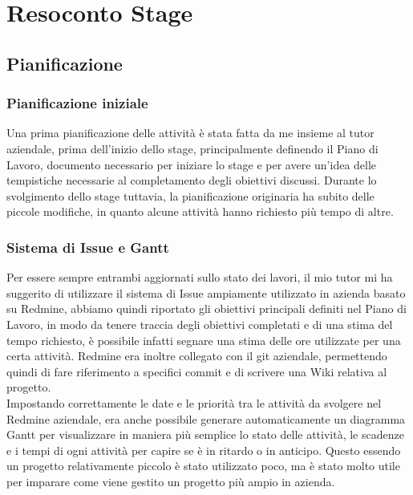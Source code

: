 
\chapter{Resoconto Stage}
\label{cap:resoconto-stage}

\section{Pianificazione}
\subsection{Pianificazione iniziale}\label{sec:pianificazione-iniziale}
Una prima pianificazione delle attività è stata fatta da me insieme al tutor aziendale, prima dell'inizio dello stage, principalmente definendo il Piano di Lavoro, documento necessario per iniziare lo stage e per avere un'idea delle tempistiche necessarie al completamento degli obiettivi discussi. Durante lo svolgimento dello stage tuttavia, la pianificazione originaria ha subito delle piccole modifiche, in quanto alcune attività hanno richiesto più tempo di altre. 

\subsection{Sistema di Issue e Gantt}
Per essere sempre entrambi aggiornati sullo stato dei lavori, il mio tutor mi ha suggerito di utilizzare il sistema di Issue ampiamente utilizzato in azienda basato su Redmine, abbiamo quindi riportato gli obiettivi principali definiti nel Piano di Lavoro, in modo da tenere traccia degli obiettivi completati e di una stima del tempo richiesto, è possibile infatti segnare una stima delle ore utilizzate per una certa attività. Redmine era inoltre collegato con il git aziendale, permettendo quindi di fare riferimento a specifici commit e di scrivere una Wiki relativa al progetto.
\\
Impostando correttamente le date e le priorità tra le attività da svolgere nel Redmine aziendale, era anche possibile generare automaticamente un diagramma Gantt per visualizzare in maniera più semplice lo stato delle attività, le scadenze e i tempi di ogni attività per capire se è in ritardo o in anticipo. Questo essendo un progetto relativamente piccolo è stato utilizzato poco, ma è stato molto utile per imparare come viene gestito un progetto più ampio in azienda.

